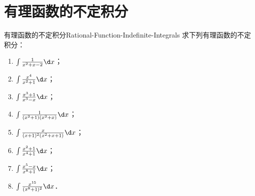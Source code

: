 \section{有理函数的不定积分}

\begin{problem}{有理函数的不定积分}{Rational-Function-Indefinite-Integrals}
    求下列有理函数的不定积分：
    \begin{enumerate}
        \item $\int \frac{1}{x^2 + x - 2} \d x$；
        \item $\int \frac{x^4}{x^2 + 1} \d x$；
        \item $\int \frac{x^3 + 1}{x^3 - x} \d x$；
        \item $\int \frac{1}{(x^2 + 1)(x^2 + x)} \d x$；
        \item $\int \frac{x}{(x + 1)^2(x^2 + x + 1)} \d x$；
        \item $\int \frac{x^2 + 1}{x^4 + 1} \d x$；
        \item $\int \frac{x^5 - x}{x^8 + 1} \d x$；
        \item $\int \frac{x^{15}}{(x^8 + 1)^2} \d x$．
    \end{enumerate}
\end{problem}


